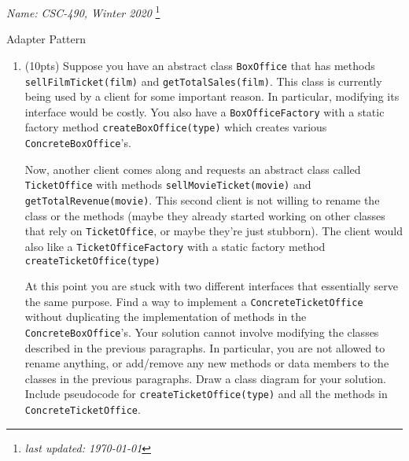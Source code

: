 \documentclass[11pt]{article}
\newlength{\up}\setlength{\up}{-\baselineskip}
\newcommand\blfootnote[1]{%
  \begingroup
  \renewcommand\thefootnote{}\footnote{#1}%
  \addtocounter{footnote}{-1}%
  \endgroup
}
\begin{document}
\noindent\emph{Name:}
\hfill
\emph{CSC-490, Winter 2020}
\blfootnote{\emph{last updated: \today}}

\vspace{-0.4in}

\begin{center}
  {\huge Adapter Pattern}
\end{center}

\medskip




\begin{enumerate}

  \item (10pts)  Suppose you have an abstract class \texttt{BoxOffice} that has methods \texttt{sellFilmTicket(film)} and  \newline\texttt{getTotalSales(film)}. This class is currently being used by a client for some important reason. In particular, modifying its interface would be costly. You also have a \texttt{BoxOfficeFactory} with a static factory method \texttt{createBoxOffice(type)} which creates various \texttt{ConcreteBoxOffice}'s.

 Now, another client comes along and requests an abstract class called \texttt{TicketOffice} with methods \newline \texttt{sellMovieTicket(movie)} and \texttt{getTotalRevenue(movie)}. This second client is not willing to rename the class or the methods (maybe they already started working on other classes that rely on \texttt{TicketOffice}, or maybe they're just stubborn). The client would also like a \texttt{TicketOfficeFactory} with a static factory method \texttt{createTicketOffice(type)} 

 At this point you are stuck with two different interfaces that essentially serve the same purpose. Find a way to implement a \texttt{ConcreteTicketOffice} without duplicating the implementation of methods in the \texttt{ConcreteBoxOffice}'s. Your solution cannot involve modifying the classes described in the previous paragraphs. In particular, you are not allowed to rename anything, or add/remove any new methods or data members to the classes in the previous paragraphs.
 Draw a class diagram for your solution. Include pseudocode for \texttt{createTicketOffice(type)}  and all the methods in \texttt{ConcreteTicketOffice}.


\end{enumerate}
\end{document}
